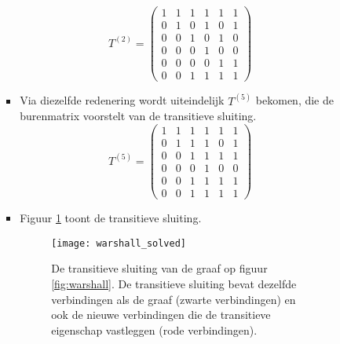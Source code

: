 \begin{itemize}
\begin{enumerate}
\begin{itemize}
\begin{itemize}
						$$T^{(2)} = \begin{pmatrix}
							1&1&1&1&1&1\\
							0&1&0&1&0&1\\
							0&0&1&0&1&0\\
							0&0&0&1&0&0\\
							0&0&0&0&1&1\\
							0&0&1&1&1&1
						\end{pmatrix}$$
						\item Via diezelfde redenering wordt uiteindelijk $T^{(5)}$ bekomen, die de burenmatrix voorstelt van de transitieve sluiting.
						$$T^{(5)} = \begin{pmatrix}
							1&1&1&1&1&1\\
							0&1&1&1&0&1\\
							0&0&1&1&1&1\\
							0&0&0&1&0&0\\
							0&0&1&1&1&1\\
							0&0&1&1&1&1
						\end{pmatrix}$$
						\item Figuur \ref{fig:warshall_solved} toont de transitieve sluiting.
						\begin{figure}[ht]
							\centering
							\texttt{[image: warshall\_solved]}
							\caption{De transitieve sluiting van de graaf op figuur \ref{fig:warshall}. De transitieve sluiting bevat dezelfde verbindingen als de graaf (zwarte verbindingen) en ook de nieuwe verbindingen die de transitieve eigenschap vastleggen (rode verbindingen). }
							\label{fig:warshall_solved}
						\end{figure}
					\end{itemize}
				\end{itemize}
				
	\end{enumerate}
\end{itemize}